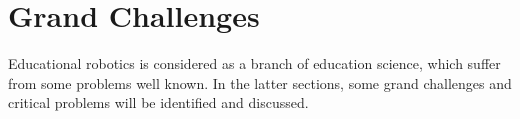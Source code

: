 \documentclass[a4paper,11pt]{article}
\begin{document}
\title{}
\author{Wangzhihui Mei \\ 2019124044 \ 6603385
\\ \\
Central China Normal University \& 
University of Wollongong Joint-Institude}


\date{}

\maketitle
\thispagestyle{empty}
\clearpage


\newpage
\setcounter{page}{1} %


\section{Grand Challenges}
Educational robotics is considered as a branch of education science, which suffer from some problems well known. In the latter sections, some grand challenges and critical problems will be identified and discussed.
\end{document}

